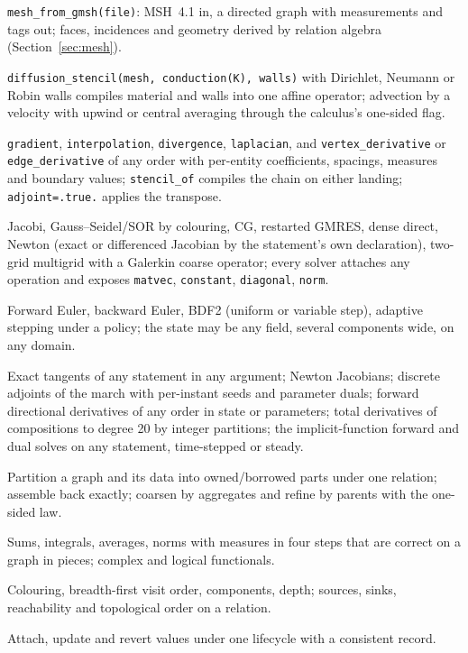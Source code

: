 \documentclass[11pt,a4paper]{article}
\newcommand{\code}[1]{\texttt{#1}}
\begin{document}
\begin{description}[nosep, leftmargin=1.6em]
\item[Load and derive a mesh.] \code{mesh\_from\_gmsh(file)}: MSH~4.1 in, a directed graph with measurements and tags out; faces, incidences and geometry derived by relation algebra (Section~\ref{sec:mesh}).
\item[State a steady problem.] \code{diffusion\_stencil(mesh, conduction(K), walls)} with Dirichlet, Neumann or Robin walls compiles material and walls into one affine operator; advection by a velocity with upwind or central averaging through the calculus's one-sided flag.
\item[Compose differential operators on any graph.] \code{gradient}, \code{interpolation}, \code{divergence}, \code{laplacian}, and \code{vertex\_derivative} or \code{edge\_derivative} of any order with per-entity coefficients, spacings, measures and boundary values; \code{stencil\_of} compiles the chain on either landing; \code{adjoint=.true.} applies the transpose.
\item[Solve.] Jacobi, Gauss--Seidel/SOR by colouring, CG, restarted GMRES, dense direct, Newton (exact or differenced Jacobian by the statement's own declaration), two-grid multigrid with a Galerkin coarse operator; every solver attaches any operation and exposes \code{matvec}, \code{constant}, \code{diagonal}, \code{norm}.
\item[Integrate in time.] Forward Euler, backward Euler, BDF2 (uniform or variable step), adaptive stepping under a policy; the state may be any field, several components wide, on any domain.
\item[Differentiate.] Exact tangents of any statement in any argument; Newton Jacobians; discrete adjoints of the march with per-instant seeds and parameter duals; forward directional derivatives of any order in state or parameters; total derivatives of compositions to degree 20 by integer partitions; the implicit-function forward and dual solves on any statement, time-stepped or steady.
\item[Cut, assemble, coarsen, refine.] Partition a graph and its data into owned/borrowed parts under one relation; assemble back exactly; coarsen by aggregates and refine by parents with the one-sided law.
\item[Reduce and broadcast.] Sums, integrals, averages, norms with measures in four steps that are correct on a graph in pieces; complex and logical functionals.
\item[Walk.] Colouring, breadth-first visit order, components, depth; sources, sinks, reachability and topological order on a relation.
\item[Change reversibly.] Attach, update and revert values under one lifecycle with a consistent record.
\end{description}
\end{document}
